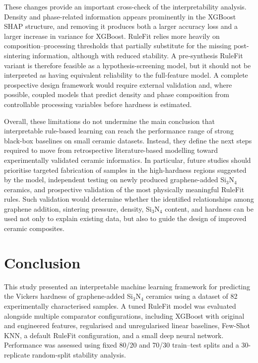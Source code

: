 \documentclass[pdflatex,sn-mathphys-num]{sn-jnl}%
\theoremstyle{thmstyleone}%
\theoremstyle{thmstyletwo}%
\theoremstyle{thmstylethree}%
\begin{document}
These changes provide an important cross-check of the interpretability analysis. Density and phase-related information appears prominently in the XGBoost SHAP structure, and removing it produces both a larger accuracy loss and a larger increase in variance for XGBoost. RuleFit relies more heavily on composition--processing thresholds that partially substitute for the missing post-sintering information, although with reduced stability. A pre-synthesis RuleFit variant is therefore feasible as a hypothesis-screening model, but it should not be interpreted as having equivalent reliability to the full-feature model. A complete prospective design framework would require external validation and, where possible, coupled models that predict density and phase composition from controllable processing variables before hardness is estimated.

Overall, these limitations do not undermine the main conclusion that interpretable
rule-based learning can reach the performance range of strong black-box baselines
on small ceramic datasets. Instead, they define the next steps required to move from
retrospective literature-based modelling toward experimentally validated ceramic
informatics. In particular, future studies should prioritise targeted fabrication of
samples in the high-hardness regions suggested by the model, independent testing on
newly produced graphene-added Si$_3$N$_4$ ceramics, and prospective validation of
the most physically meaningful RuleFit rules. Such validation would determine whether the identified relationships among graphene addition, sintering pressure, density, Si$_3$N$_4$ content, and hardness can be used not only to explain existing data, but also to guide the design of improved ceramic composites.


\section{Conclusion}

This study presented an interpretable machine learning framework for predicting the Vickers hardness of graphene-added Si$_3$N$_4$ ceramics using a dataset of 82 experimentally characterised samples. A tuned RuleFit model was evaluated alongside multiple comparator configurations, including XGBoost with original and engineered features, regularised and unregularised linear baselines, Few-Shot KNN, a default RuleFit configuration, and a small deep neural network. Performance was assessed using fixed 80/20 and 70/30 train--test splits and a 30-replicate random-split stability analysis.
\end{document}
